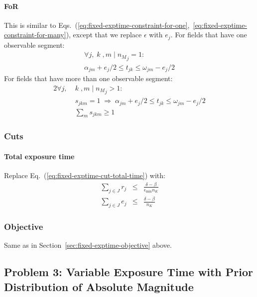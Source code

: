 \documentclass[twocolumn,times]{aastex631}
\begin{document}
\paragraph{\ac{FoR}}
This is similar to Eqs.~(\ref{eq:fixed-exptime-constraint-for-one},~\ref{eq:fixed-exptime-constraint-for-many}), except that we replace $\epsilon$ with $e_j$. For fields that have one observable segment:
%
\begin{multline}
    \label{eq:variable-exptime-constraint-for-one}
    \forall j ,\; k \;, m \mid {n_M}_j = 1 : \\ \alpha_{jm} + e_j / 2 \leq t_{jk} \leq \omega_{jm} - e_j / 2
\end{multline}
%
For fields that have more than one observable segment:
%
\begin{alignat}{2}
    \label{eq:variable-exptime-constraint-for-many}
    \forall j ,\; &k \;, m \mid {n_M}_j > 1 : \nonumber \\
    &s_{jkm} = 1 \;\Rightarrow\; \alpha_{jm} + e_j / 2 \leq t_{jk} \leq \omega_{jm} - e_j / 2 \\
    &\sum_m s_{jkm} \geq 1
\end{alignat}

\subsubsection{Cuts}

\paragraph{Total exposure time}
Replace Eq.~(\ref{eq:fixed-exptime-cut-total-time}) with:
%
\begin{eqnarray}
    \label{eq:variable-exptime-cut-total-time}
    \sum_{j \in J} r_j &\leq& \frac{\delta - \beta}{\epsilon_\mathrm{min} n_K} \\
    \sum_{j \in J} e_j &\leq& \frac{\delta - \beta}{n_K}
\end{eqnarray}

\subsubsection{Objective}

Same as in Section~\ref{sec:fixed-exptime-objective} above.

\subsection{Problem 3: Variable Exposure Time with Prior Distribution of Absolute Magnitude}
\label{sec:absmag-distn}
\end{document}
